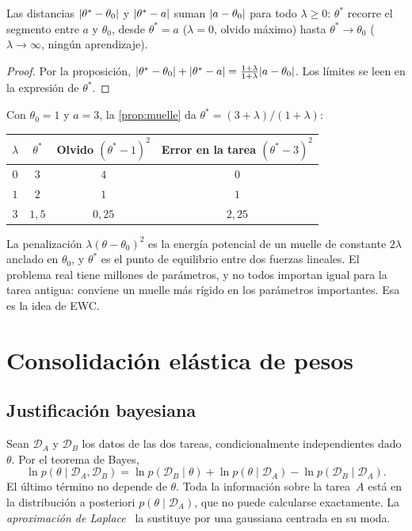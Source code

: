 \begin{corolario}\label{cor:frontera}
Las distancias $\lvert\theta^{\ast}-\theta_0\rvert$ y $\lvert\theta^{\ast}-a\rvert$ suman $\lvert a-\theta_0\rvert$ para todo $\lambda\ge 0$: $\theta^{\ast}$ recorre el segmento entre $a$ y $\theta_0$, desde $\theta^{\ast}=a$ ($\lambda=0$, olvido máximo) hasta $\theta^{\ast}\to\theta_0$ ($\lambda\to\infty$, ningún aprendizaje).
\end{corolario}

\begin{proof}
Por la proposición, $\lvert\theta^{\ast}-\theta_0\rvert+\lvert\theta^{\ast}-a\rvert=\frac{1+\lambda}{1+\lambda}\lvert a-\theta_0\rvert$. Los límites se leen en la expresión de $\theta^{\ast}$.
\end{proof}

\begin{ejemplo}\label{ej:muelle}
Con $\theta_0=1$ y $a=3$, la \cref{prop:muelle} da $\theta^{\ast}=(3+\lambda)/(1+\lambda)$:
\begin{center}\small
\begin{tabular}{@{}cccc@{}}
\toprule
$\lambda$ & $\theta^{\ast}$ & Olvido $(\theta^{\ast}-1)^{2}$ & Error en la tarea $(\theta^{\ast}-3)^{2}$ \\
\midrule
$0$ & $3$ & $4$ & $0$ \\
$1$ & $2$ & $1$ & $1$ \\
$3$ & $1{,}5$ & $0{,}25$ & $2{,}25$ \\
\bottomrule
\end{tabular}
\end{center}
\end{ejemplo}

La penalización $\lambda(\theta-\theta_0)^{2}$ es la energía potencial de un muelle de constante $2\lambda$ anclado en $\theta_0$, y $\theta^{\ast}$ es el punto de equilibrio entre dos fuerzas lineales. El problema real tiene millones de parámetros, y no todos importan igual para la tarea antigua: conviene un muelle más rígido en los parámetros importantes. Esa es la idea de EWC.

\section{Consolidación elástica de pesos}

\subsection{Justificación bayesiana}

Sean $\mathcal{D}_A$ y $\mathcal{D}_B$ los datos de las dos tareas, condicionalmente independientes dado $\theta$. Por el teorema de Bayes,
\begin{equation}\label{eq:bayes-secuencial}
\ln p(\theta\mid\mathcal{D}_A,\mathcal{D}_B)=\ln p(\mathcal{D}_B\mid\theta)+\ln p(\theta\mid\mathcal{D}_A)-\ln p(\mathcal{D}_B\mid\mathcal{D}_A).
\end{equation}
El último término no depende de $\theta$. Toda la información sobre la tarea~$A$ está en la distribución a posteriori $p(\theta\mid\mathcal{D}_A)$, que no puede calcularse exactamente. La \emph{aproximación de Laplace}~\cite[§4.4]{bishop} la sustituye por una gaussiana centrada en su moda.

